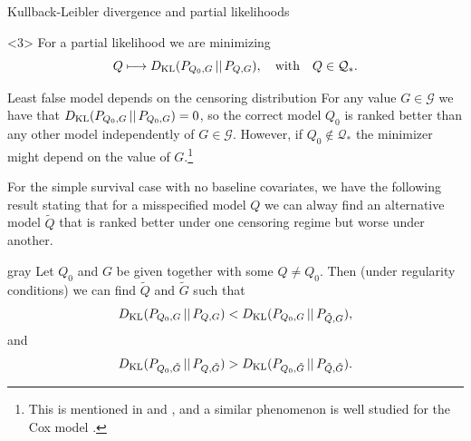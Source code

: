 \documentclass[smaller]{beamer}\usepackage{listings}
\begin{document}
\begin{frame}[label={sec:org78f30c6}]{Kullback-Leibler divergence and partial likelihoods}
\begin{onlyenv}<3>
For a partial likelihood we are minimizing
\begin{equation*}
  Q \longmapsto D_{\mathrm{KL}}(P_{Q_0,G} \, || \, P_{Q,G}),
  \quad \text{with} \quad Q \in \mathcal{Q}_*.
\end{equation*}

\vfill

\end{onlyenv}
\end{frame}

\begin{frame}[label={sec:org2b925bd}]{Least false model depends on the censoring distribution}
\small For any value \(G \in \mathcal{G}\) we have that \(D_{\mathrm{KL}}(P_{Q_0,G} \, || \, P_{Q_0,G}) = 0\), so
the correct model \(Q_0\) is ranked better than any other model independently of \(G \in \mathcal{G}\).
However, if \(Q_0 \not \in \mathcal{Q}_*\) the minimizer might depend on the value of \(G\).\footnote{This is mentioned in \cite{whitney2019comment} and \cite{van2003unicv}, and a similar
phenomenon is well studied for the Cox model
\citep{struthers1986misspecified,hjort1992inference,fine2002comparing}.}

\vfill \pause

For the simple survival case with no baseline covariates, we have the following result stating that
for a misspecified model \(Q\) we can alway find an alternative model \(\tilde Q\) that is ranked
better under one censoring regime but worse under another.

\vfill


\begin{beamercolorbox}[rounded=true]{gray}
Let $Q_0$ and $G$ be given together with some $Q \not = Q_0$. Then (under
regularity conditions) we can find $\tilde Q$ and $\tilde G$ such
that
\begin{equation*}
  D_{\mathrm{KL}}(P_{Q_0, G} \, || \, P_{Q, G}) < D_{\mathrm{KL}}(P_{Q_0, G} \, || \, P_{\tilde Q, G}),
\end{equation*}
and
\begin{equation*}
  D_{\mathrm{KL}}(P_{Q_0, \tilde G} \, || \, P_{Q, \tilde G}) > D_{\mathrm{KL}}(P_{Q_0, \tilde G} \, || \, P_{\tilde Q,
    \tilde G}).
\end{equation*}
\end{beamercolorbox}
\end{frame}
\end{document}
